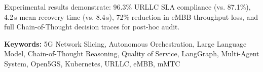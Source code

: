 \documentclass[12pt,a4paper]{report}
\begin{document}
Experimental results demonstrate: 96.3\% URLLC SLA compliance (vs. 87.1\%), 4.2\,s mean recovery time (vs. 8.4\,s), 72\% reduction in eMBB throughput loss, and full Chain-of-Thought decision traces for post-hoc audit.

\vspace{0.5cm}
\noindent\textbf{Keywords:} 5G Network Slicing, Autonomous Orchestration, Large Language Model, Chain-of-Thought Reasoning, Quality of Service, LangGraph, Multi-Agent System, Open5GS, Kubernetes, URLLC, eMBB, mMTC

\newpage\tableofcontents
\newpage\listoftables
\newpage\listoffigures

\setcounter{page}{1}







\end{document}
